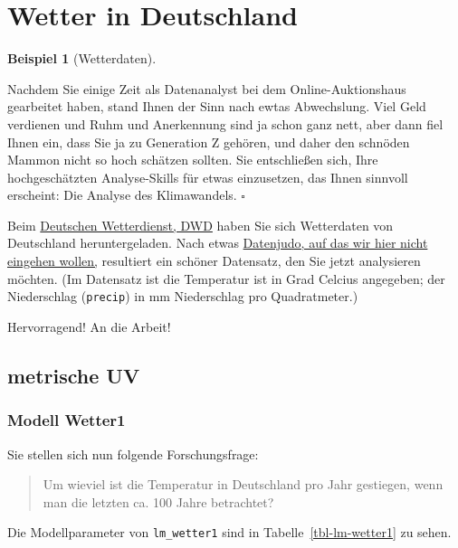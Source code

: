 \documentclass[
  letterpaper,
]{scrbook}
\theoremstyle{definition}
\theoremstyle{definition}
\newtheorem{example}{Beispiel}[chapter]
\theoremstyle{definition}
\theoremstyle{remark}
\begin{document}
\section{Wetter in Deutschland}\label{wetter-in-deutschland}

\begin{example}[Wetterdaten]\protect\hypertarget{exm-wetterdaten}{}\label{exm-wetterdaten}

Nachdem Sie einige Zeit als Datenanalyst bei dem Online-Auktionshaus
gearbeitet haben, stand Ihnen der Sinn nach ewtas Abwechslung. Viel Geld
verdienen und Ruhm und Anerkennung sind ja schon ganz nett, aber dann
fiel Ihnen ein, dass Sie ja zu Generation Z gehören, und daher den
schnöden Mammon nicht so hoch schätzen sollten. Sie entschließen sich,
Ihre hochgeschätzten Analyse-Skills für etwas einzusetzen, das Ihnen
sinnvoll erscheint: Die Analyse des Klimawandels. \(\square\)

\end{example}

Beim \href{https://www.dwd.de/DE/Home/home_node.html}{Deutschen
Wetterdienst, DWD} haben Sie sich Wetterdaten von Deutschland
heruntergeladen. Nach etwas
\href{https://data-se.netlify.app/2022/07/24/preparing-german-weather-data/}{Datenjudo,
auf das wir hier nicht eingehen wollen,} resultiert ein schöner
Datensatz, den Sie jetzt analysieren möchten. (Im Datensatz ist die
Temperatur ist in Grad Celcius angegeben; der Niederschlag
(\texttt{precip}) in mm Niederschlag pro Quadratmeter.)

Hervorragend! An die Arbeit!

\subsection{metrische UV}\label{metrische-uv}

\subsubsection{Modell Wetter1}\label{modell-wetter1}

Sie stellen sich nun folgende Forschungsfrage:

\begin{quote}
{} Um wieviel ist die Temperatur in Deutschland pro Jahr
gestiegen, wenn man die letzten ca. 100 Jahre betrachtet?
\end{quote}

Die Modellparameter von \texttt{lm\_wetter1} sind in
Tabelle~\ref{tbl-lm-wetter1} zu sehen.
\end{document}
